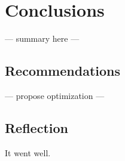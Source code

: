 \section{Conclusions}
--- summary here ---

\subsection{Recommendations}
--- propose optimization ---

\subsection{Reflection}
It went well.
